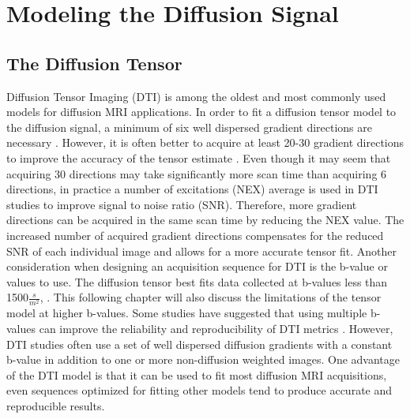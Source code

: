 \section{Modeling the Diffusion Signal}
\subsection{The Diffusion Tensor}
    Diffusion Tensor Imaging (DTI) is among the oldest and most commonly used models for diffusion MRI applications. In order to fit a diffusion tensor model to the diffusion signal, a minimum of six well dispersed gradient directions are necessary \cite{Hasan_2001}. However, it is often better to acquire at least 20-30 gradient directions to improve the accuracy of the tensor estimate \cite{Jones_2004}. Even though it may seem that acquiring 30 directions may take significantly more scan time than acquiring 6 directions, in practice a number of excitations (NEX) average is used in DTI studies to improve signal to noise ratio (SNR). Therefore, more gradient directions can be acquired in the same scan time by reducing the NEX value. The increased number of acquired gradient directions compensates for the reduced SNR of each individual image and allows for a more accurate tensor fit. Another consideration when designing an acquisition sequence for DTI is the b-value or values to use. The diffusion tensor best fits data collected at b-values less than 1500$\frac{s}{m^2}$, \cite{Clark_2000}. This following chapter will also discuss the limitations of the tensor model at higher b-values. Some studies have suggested that using multiple b-values can improve the reliability and reproducibility of DTI metrics \cite{Correia_2009}. However, DTI studies often use a set of well dispersed diffusion gradients with a constant b-value in addition to one or more non-diffusion weighted images. One advantage of the DTI model is that it can be used to fit most diffusion MRI acquisitions, even sequences optimized for fitting other models tend to produce accurate and reproducible results.